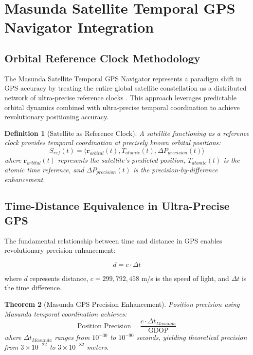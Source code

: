 \documentclass[12pt,a4paper]{article}
\newtheorem{theorem}{Theorem}[section]
\newtheorem{definition}[theorem]{Definition}
\begin{document}
\section{Masunda Satellite Temporal GPS Navigator Integration}

\subsection{Orbital Reference Clock Methodology}

The Masunda Satellite Temporal GPS Navigator represents a paradigm shift in GPS accuracy by treating the entire global satellite constellation as a distributed network of ultra-precise reference clocks \cite{masunda2025temporal}. This approach leverages predictable orbital dynamics combined with ultra-precise temporal coordination to achieve revolutionary positioning accuracy.

\begin{definition}[Satellite as Reference Clock]
A satellite functioning as a reference clock provides temporal coordination at precisely known orbital positions:
\begin{equation}
S_{ref}(t) = \langle \mathbf{r}_{orbital}(t), T_{atomic}(t), \Delta P_{precision}(t) \rangle
\end{equation}
where $\mathbf{r}_{orbital}(t)$ represents the satellite's predicted position, $T_{atomic}(t)$ is the atomic time reference, and $\Delta P_{precision}(t)$ is the precision-by-difference enhancement.
\end{definition}

\subsection{Time-Distance Equivalence in Ultra-Precise GPS}

The fundamental relationship between time and distance in GPS enables revolutionary precision enhancement:

\begin{equation}
d = c \cdot \Delta t
\end{equation}

where $d$ represents distance, $c = 299,792,458$ m/s is the speed of light, and $\Delta t$ is the time difference.

\begin{theorem}[Masunda GPS Precision Enhancement]
Position precision using Masunda temporal coordination achieves:
\begin{equation}
\text{Position Precision} = \frac{c \cdot \Delta t_{Masunda}}{\text{GDOP}}
\end{equation}
where $\Delta t_{Masunda}$ ranges from $10^{-30}$ to $10^{-90}$ seconds, yielding theoretical precision from $3 \times 10^{-22}$ to $3 \times 10^{-82}$ meters.
\end{theorem}
\end{document}
